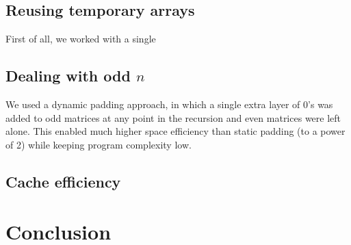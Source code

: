\documentclass[10pt]{article}
\begin{document}
\subsection{Reusing temporary arrays}
First of all, we worked with a single 

\subsection{Dealing with odd $n$}
We used a dynamic padding approach, in which a single extra layer of 0's was added to odd matrices at any point in the recursion and even matrices were left alone. This enabled much higher space efficiency than static padding (to a power of 2) while keeping program complexity low. 

\subsection{Cache efficiency}




\section {Conclusion}
\end{document}
